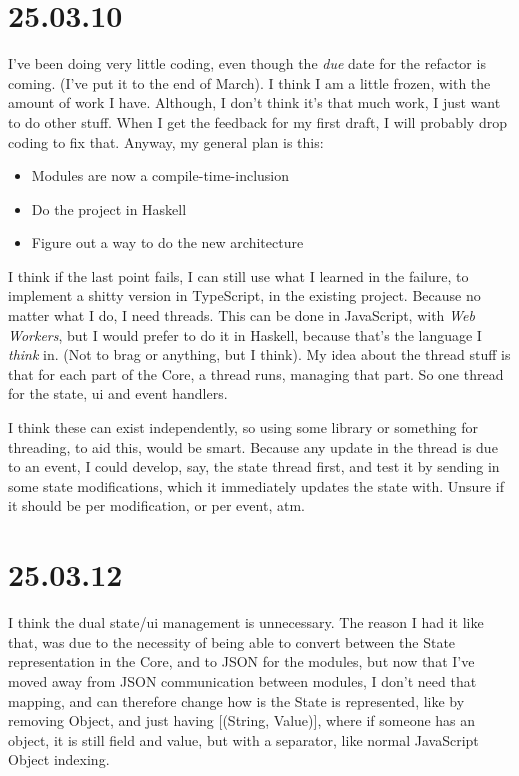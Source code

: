 \section{25.03.10}

I've been doing very little coding, even though the \textit{due} date for the
refactor is coming. (I've put it to the end of March). I think I am a little
frozen, with the amount of work I have. Although, I don't think it's that much
work, I just want to do other stuff. When I get the feedback for my first draft,
I will probably drop coding to fix that. Anyway, my general plan is this:

\begin{itemize}
  \item Modules are now a compile-time-inclusion
  \item Do the project in Haskell
  \item Figure out a way to do the new architecture
\end{itemize}

I think if the last point fails, I can still use what I learned in the failure,
to implement a shitty version in TypeScript, in the existing project. Because
no matter what I do, I need threads. This can be done in JavaScript, with
\textit{Web Workers}, but I would prefer to do it in Haskell, because that's the
language I \textit{think} in. (Not to brag or anything, but I think). My idea
about the thread stuff is that for each part of the Core, a thread runs,
managing that part. So one thread for the state, ui and event handlers.

I think these can exist independently, so using some library or something for
threading, to aid this, would be smart. Because any update in the thread is due
to an event, I could develop, say, the state thread first, and test it by
sending in some state modifications, which it immediately updates the state
with. Unsure if it should be per modification, or per event, atm.


\section{25.03.12}

I think the dual state/ui management is unnecessary. The reason I had it like
that, was due to the necessity of being able to convert between the State
representation in the Core, and to JSON for the modules, but now that I've moved
away from JSON communication between modules, I don't need that mapping, and can
therefore change how is the State is represented, like by removing Object, and
just having [(String, Value)], where if someone has an object, it is still field
and value, but with a separator, like normal JavaScript Object indexing.


